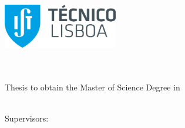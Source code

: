 
\begin{titlepage}
\includegraphics[width=5cm]{images/ist-logo}~\\[1.5cm]
\begin{center}
{\LARGE \textbf{\Title}}\\[1.5cm]
{\Large \textbf{\StudentName}}\\[1.5cm]
{\large Thesis to obtain the Master of Science Degree in}\\[0.35cm]
{\LARGE \textbf{\DegreeName}}\\[1.5cm]

\begin{minipage}[t]{.32\textwidth}
  \begin{flushright}
    {\large Supervisors:~~}\\
  \end{flushright}
\end{minipage}%
\begin{minipage}[t]{.68\textwidth}
  \begin{flushleft}
    {\large \MainSupervisor \\
     \large \SecondSupervisor}
  \end{flushleft}
\end{minipage}\\[1.5cm]


\end{center}
\end{titlepage}
